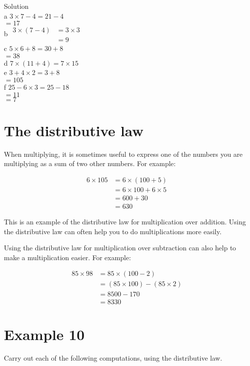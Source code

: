 \documentclass[10pt]{article}
\begin{document}
Solution\\
a \(3 \times 7-4=21-4\)\\
\(=17\)\\
b \(\begin{aligned} 3 \times(7-4) & =3 \times 3 \\ & =9\end{aligned}\)\\
c \(5 \times 6+8=30+8\)\\
\(=38\)\\
d \(7 \times(11+4)=7 \times 15\)\\
e \(3+4 \times 2=3+8\)\\
\(=105\)\\
f \(25-6 \times 3=25-18\)\\
\(=11\)\\
\(=7\)

\section*{The distributive law}
When multiplying, it is sometimes useful to express one of the numbers you are multiplying as a sum of two other numbers. For example:

\[
\begin{aligned}
6 \times 105 & =6 \times(100+5) \\
& =6 \times 100+6 \times 5 \\
& =600+30 \\
& =630
\end{aligned}
\]

This is an example of the distributive law for multiplication over addition. Using the distributive law can often help you to do multiplications more easily.

Using the distributive law for multiplication over subtraction can also help to make a multiplication easier. For example:

\[
\begin{aligned}
85 \times 98 & =85 \times(100-2) \\
& =(85 \times 100)-(85 \times 2) \\
& =8500-170 \\
& =8330
\end{aligned}
\]

\section*{Example 10}
Carry out each of the following computations, using the distributive law.
\end{document}
